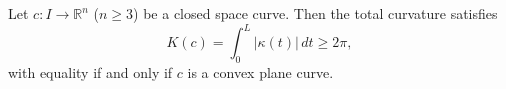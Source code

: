 Let $c: I \to \mathbb{R}^n$ ($n \geq 3$) be a closed space curve. Then the total curvature satisfies
$$K(c) = \int_0^L |\kappa(t)|\,dt \geq 2\pi,$$
with equality if and only if $c$ is a convex plane curve.
